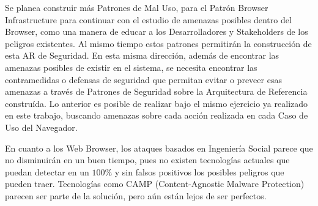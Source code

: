 Se planea construir más Patrones de Mal Uso, para el Patrón Browser Infrastructure para continuar con el estudio de amenazas posibles dentro del Browser, como una manera de educar a los Desarrolladores y Stakeholders de los peligros existentes. Al mismo tiempo estos patrones permitirán la construcción de esta AR de Seguridad. En esta misma dirección, además de encontrar las amenazas posibles de existir en el sistema, se necesita encontrar las contramedidas o defensas de seguridad que permitan evitar o preveer esas amenazas a través de Patrones de Seguridad sobre la Arquitectura de Referencia construída. Lo anterior es posible de realizar bajo el mismo ejercicio ya realizado en este trabajo, buscando amenazas sobre cada acción realizada en cada Caso de Uso del Navegador.

En cuanto a los Web Browser, los ataques basados en Ingeniería Social parece que no disminuirán en un buen tiempo, pues no existen tecnologías actuales que puedan detectar en un \(100\%\) y sin falsos positivos los posibles peligros que pueden traer. Tecnologías como CAMP (Content-Agnostic Malware Protection) parecen ser parte de la solución, pero aún están lejos de ser perfectos.